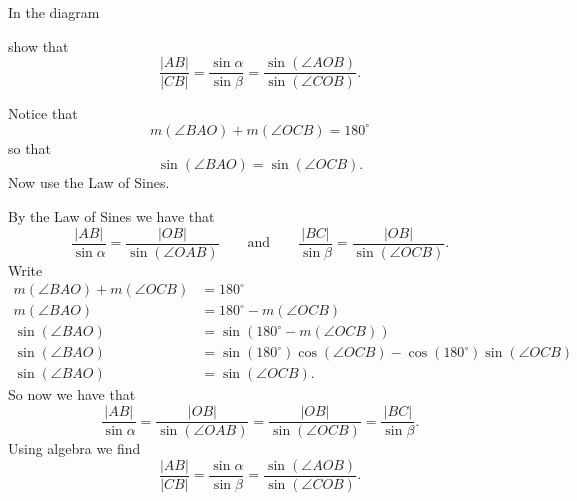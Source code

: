 \documentclass{ximera}
\begin{document}
\begin{problem}\label{46}
In the diagram
\begin{image}
\end{image}
show that%
\[
\frac{\left\vert AB\right\vert }{\left\vert CB\right\vert }=\frac
{\sin\alpha}{\sin\beta}=\frac{\sin\left(  \angle
AOB\right)  }{\sin\left(  \angle COB\right)  }.
\]


\begin{hint}
Notice that
\[
m\left(  \angle BAO\right)  +m\left(\angle OCB\right)  =180^{\circ}%
\]
so that%
\[
\sin\left(  \angle BAO\right)  =\sin\left(\angle  OCB\right)  .
\]
Now use the Law of Sines.
\end{hint}
\begin{freeResponse}
By the Law of Sines we have that
\[
\frac{|AB|}{\sin\alpha} = \frac{|OB|}{\sin(\angle OAB)}\qquad\text{and}\qquad\frac{|BC|}{\sin\beta} = \frac{|OB|}{\sin(\angle OCB)}.
\]
Write 
\begin{align*}
m\left(  \angle BAO\right)  +m\left(\angle OCB\right)  &=180^{\circ}\\
m\left(  \angle BAO\right)  &=180^{\circ}-m\left(\angle OCB\right)  \\
\sin\left(\angle BAO\right)  &=\sin\left(180^{\circ}-m\left(\angle OCB\right)\right)  \\
\sin\left(\angle BAO\right)  &=\sin\left(180^{\circ}\right)\cos\left(\angle OCB\right) - \cos\left(180^{\circ}\right)\sin\left(\angle OCB\right)\\ 
\sin\left(\angle BAO\right)  &=\sin\left(\angle OCB\right).
\end{align*}
So  now we have that 
\[
\frac{|AB|}{\sin\alpha} = \frac{|OB|}{\sin(\angle OAB)}= \frac{|OB|}{\sin(\angle OCB)}=\frac{|BC|}{\sin\beta}. 
\]
Using algebra we find 
\[
\frac{\left\vert AB\right\vert }{\left\vert CB\right\vert }=\frac
{\sin\alpha}{\sin\beta}=\frac{\sin\left(  \angle
AOB\right)  }{\sin\left(  \angle COB\right)  }.
\]
\end{freeResponse}
\end{problem}
\end{document}
